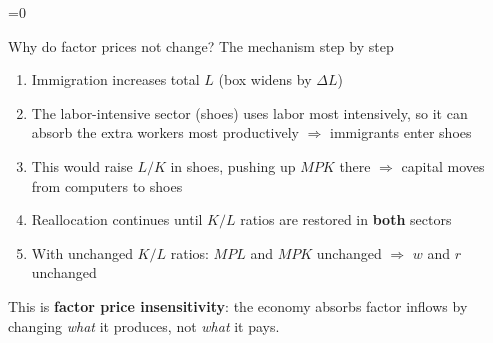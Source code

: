 \documentclass{beamer}
\newcommand{\showanswers}{1}  %
\begin{document}

\ifnum\showanswers=0

\begin{frame}{Why do factor prices not change? The mechanism step by step}

\begin{enumerate}
    \item Immigration increases total $L$ (box widens by $\Delta L$)

    \vspace{0.1cm}

    \item The labor-intensive sector (shoes) uses labor most intensively, so it can absorb the extra workers most productively $\Rightarrow$ immigrants enter shoes

    \vspace{0.1cm}

    \item This would raise $L/K$ in shoes, pushing up $MPK$ there $\Rightarrow$ capital moves from computers to shoes

    \vspace{0.1cm}

    \item Reallocation continues until $K/L$ ratios are restored in \textbf{both} sectors

    \vspace{0.1cm}

    \item With unchanged $K/L$ ratios: $MPL$ and $MPK$ unchanged $\Rightarrow$ $w$ and $r$ unchanged

\end{enumerate}

\vspace{0.3cm}

This is \textbf{factor price insensitivity}: the economy absorbs factor inflows by changing \textit{what} it produces, not \textit{what} it pays.

\end{frame}

\fi


\end{document}
